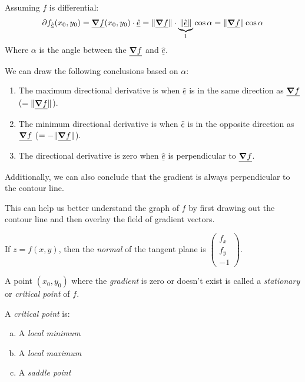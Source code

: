 \documentclass[00_complete]{subfiles}
\begin{document}
Assuming $f$ is differential:
\begin{gather*}
    \partial f_{\hat{\underline e}}(x_0,y_0)=\underline{\grad f}(x_0,y_0)\cdot
    \underline{\hat e} = \|\underline{\grad f}\|\cdot \underbrace{\|\hat{\underline
    e}\|}_{1}\cos \alpha = \|\underline {\grad f}\|\cos \alpha
\end{gather*}
Where $\alpha$ is the angle between the $\underline{\grad f}$ and $\hat{\underline
e}$.
\begin{conclusion}
We can draw the following conclusions based on $\alpha$:
    \begin{enumerate}
    \item The maximum directional derivative is when $\hat{\underline
    e}$ is in the same direction as $\underline{\grad f}$
    ($=\|\underline{\grad f}\|$).
    \item The minimum directional derivative is when $\hat{\underline
    e}$ is in the opposite direction as $\underline{\grad f}$
    ($=-\|\underline{\grad f}\|$).
    \item The directional derivative is zero when $\hat{\underline
    e}$ is perpendicular to $\underline{\grad f}$.
    \end{enumerate}
    Additionally, we can also conclude that the gradient is always
    perpendicular to the contour line.
\end{conclusion}
This can help us better understand the graph of $f$ by first drawing out the
contour line and then overlay the field of gradient vectors.
\begin{note}
    If $z=f(x,y)$, then the \emph{normal} of the tangent plane is
    $\begin{pmatrix}
        f_x\\f_y\\-1
    \end{pmatrix}$.
\end{note}
\begin{definition}
    A point $(x_0,y_0)$ where the \emph{gradient} is zero or doesn't exist is
    called a \emph{stationary} or \emph{critical point} of $f$.

    A \emph{critical point} is:
    \begin{enumerate}[a.] \tightlist
        \item A \emph{local minimum}
        \item A \emph{local maximum}
        \item A \emph{saddle point}
    \end{enumerate}
\end{definition}
\end{document}
